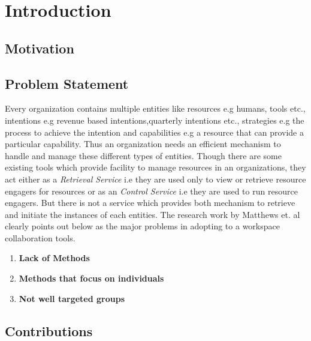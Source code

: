 \chapter{Introduction}
\label{chap:introduction}


\section{Motivation}
\label{sec:motivation}


\section{Problem Statement}
\label{sec:problemstatement}
\hspace{4ex} Every organization contains multiple entities like resources e.g humans, tools etc., intentions e.g revenue based intentions,quarterly intentions etc., strategies e.g the process to achieve the intention and capabilities e.g a resource that can provide a particular capability. Thus an organization needs an efficient mechanism to handle and manage these different types of entities. Though there are some existing tools which provide facility to manage resources in an organizations, they act either as a \textit{Retrieval Service} i.e they are used only to view or retrieve resource engagers for resources or as an \textit{Control Service} i.e they are used to run resource engagers. But there is not a service which provides both mechanism to retrieve and initiate the instances of each entities. The research work by Matthews et. al \cite{Matthews2011}  clearly points out below as the major problems in adopting to a workspace collaboration tools.

\begin{enumerate}
	\item \textbf{Lack of Methods}
	\item \textbf{Methods that focus on individuals}
	\item \textbf{Not well targeted groups}
\end{enumerate}

\section{Contributions}
\label{sec:contributions}


